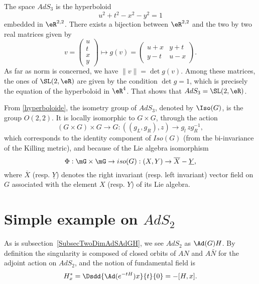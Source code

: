 The space $AdS_3$ is the hyperboloid
\begin{equation} \label{hyperboloide}
	u^2 + t^2 - x^2 - y^2 = 1
\end{equation}
embedded in $\eR^{2,2}$. There exists a bijection between $\eR^{2,2}$ and the two by two real matrices given by
\[
	v= \begin{pmatrix}
		u \\t\\x\\y
	\end{pmatrix}
	\mapsto
	g(v)=\begin{pmatrix}
		u+x & y+t \\
		y-t & u-x
	\end{pmatrix}.
\]
As far as norm is concerned, we have $\| v \|=\det g(v)$. Among these matrices, the ones of $\SL(2,\eR)$ are given by the condition $\det g=1$, which is precisely the equation of the hyperboloid in $\eR^{4}$. That shows that $AdS_3=\SL(2,\eR)$.

From \eqref{hyperboloide}, the isometry group of $AdS_3$, denoted by $\Iso(G)$, is the group $O(2,2)$. It is locally isomorphic to $G \times G$, through the action
\begin{equation}
	(G \times G) \times G \longrightarrow G \colon((g_L,g_R),z)
	\rightarrow g_l \, z g_R^{-1},
\end{equation}
which corresponds to the identity component of $Iso(G)$ (from the bi-invariance of the Killing metric), and because of the Lie algebra isomorphism
\begin{equation}\label{Iso}
	\Phi: \mG \times \mG \rightarrow iso(G) : (X,Y)
	\rightarrow  \overline{X} - \underline{Y},
\end{equation}
where $\overline{X}$ (resp. $\underline{Y}$) denotes the right invariant (resp. left invariant) vector field on $G$ associated with the element $X$ (resp. $Y$) of its Lie algebra.

\section{Simple example on \texorpdfstring{$AdS_{2}$}{AdS2}}\label{sec_AdSdeux}

As is subsection~\ref{SubsecTwoDimAdSAdGH}, we see $AdS_2$ as $\Ad(G)H$. By definition the singularity is composed of closed orbits of $AN$ and $A\bar{N}$ for the adjoint action on $AdS_2$, and the notion of fundamental field is
\begin{equation}
	H^*_x=\Dsdd{\Ad(e^{-tH})x}{t}{0} =-[H,x].
\end{equation}

